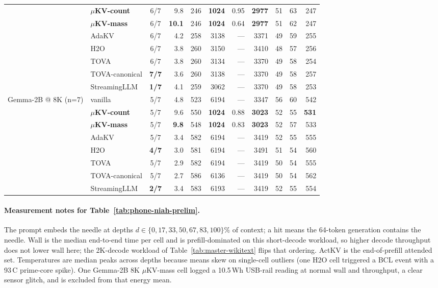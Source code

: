 \documentclass[sigconf, anonymous=false, screen=true]{acmart}
\newcommand{\good}[1]{\textcolor{kvgreen}{\textbf{#1}}}
\newcommand{\bad}[1]{\textcolor{kvred}{\textbf{#1}}}
\begin{document}
\begin{table}[tp]
\begin{tabular}{l l c r r r r r r r r}
 & \textbf{$\mu$KV-count} & 6/7 &  9.8 &  246 & \good{1024} & 0.95 & \good{2977} & 51 & 63 &  247 \\
 & \textbf{$\mu$KV-mass}  & 6/7 & \good{10.1} &  246 & \good{1024} & 0.64 & \good{2977} & 51 & 62 &  247 \\
 & AdaKV                & 6/7 &  4.2 &  258 & 3138 & ---  & 3371 & 49 & 59 &  255 \\
 & H2O                  & 6/7 &  3.8 &  260 & 3150 & ---  & 3410 & 48 & 57 &  256 \\
 & TOVA                 & 6/7 &  3.8 &  260 & 3134 & ---  & 3370 & 49 & 58 &  254 \\
 & TOVA-canonical       & \good{7/7} &  3.6 &  260 & 3138 & ---  & 3370 & 49 & 58 &  257 \\
 & StreamingLLM         & \bad{1/7} &  4.1 &  259 & 3062 & ---  & 3370 & 49 & 58 &  253 \\
\midrule
\multirow{8}{*}{Gemma-2B @ 8K (n=7)}
 & vanilla              & 5/7 &  4.8 &  523 & 6194 & ---  & 3347 & 56 & 60 &  542 \\
 & \textbf{$\mu$KV-count} & 5/7 &  9.6 &  550 & \good{1024} & 0.88 & \good{3023} & 52 & 55 &  \good{531} \\
 & \textbf{$\mu$KV-mass}  & 5/7 & \good{9.8} &  548 & \good{1024} & 0.83 & \good{3023} & 52 & 57 &  533 \\
 & AdaKV                & 5/7 &  3.4 &  582 & 6194 & ---  & 3419 & 52 & 55 &  555 \\
 & H2O                  & \bad{4/7} &  3.0 &  581 & 6194 & ---  & 3491 & 51 & 54 &  560 \\
 & TOVA                 & 5/7 &  2.9 &  582 & 6194 & ---  & 3419 & 50 & 54 &  555 \\
 & TOVA-canonical       & 5/7 &  2.7 &  586 & 6136 & ---  & 3419 & 50 & 54 &  562 \\
 & StreamingLLM         & \bad{2/7} &  3.4 &  583 & 6193 & ---  & 3419 & 52 & 55 &  554 \\
\bottomrule
\end{tabular}
\end{table}


\paragraph{Measurement notes for Table~\ref{tab:phone-niah-prelim}.} The prompt embeds the needle at depths $d\in\{0,17,33,50,67,83,100\}\%$ of context; a hit means the 64-token generation contains the needle. Wall is the median end-to-end time per cell and is prefill-dominated on this short-decode workload, so higher decode throughput does not lower wall here; the 2K-decode workload of Table~\ref{tab:master-wikitext} flips that ordering. ActKV is the end-of-prefill attended set. Temperatures are median peaks across depths because means skew on single-cell outliers (one H2O cell triggered a BCL event with a 93\,\textdegree C prime-core spike). One Gemma-2B 8K $\mu$KV-mass cell logged a 10.5\,Wh USB-rail reading at normal wall and throughput, a clear sensor glitch, and is excluded from that energy mean.
\end{document}
